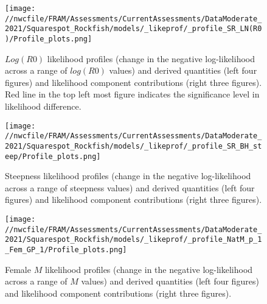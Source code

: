 \documentclass[11pt,
  english,
  a4paper,
]{article}
\begin{document}
\begin{figure}
\centering
\texttt{[image: //nwcfile/FRAM/Assessments/CurrentAssessments/DataModerate\_2021/Squarespot\_Rockfish/models/\_likeprof/\_profile\_SR\_LN(R0)/Profile\_plots.png]}
\caption{{\(Log(R0)\)\leavevmode\tagmcend\tagstructend} likelihood profiles (change in the negative log-likelihood across a range of {\(log(R0)\)\leavevmode\tagmcend\tagstructend} values) and derived quantities (left four figures) and likelihood component contributions (right three figures). Red line in the top left most figure indicates the significance level in likelihood difference.\label{fig:r0-profile-combo}}
\end{figure}

\tagmcend\tagstructend


\begin{figure}
\centering
\texttt{[image: //nwcfile/FRAM/Assessments/CurrentAssessments/DataModerate\_2021/Squarespot\_Rockfish/models/\_likeprof/\_profile\_SR\_BH\_steep/Profile\_plots.png]}
\caption{Steepness likelihood profiles (change in the negative log-likelihood across a range of steepness values) and derived quantities (left four figures) and likelihood component contributions (right three figures).\label{fig:steepness-profile-combo}}
\end{figure}

\tagmcend\tagstructend


\begin{figure}
\centering
\texttt{[image: //nwcfile/FRAM/Assessments/CurrentAssessments/DataModerate\_2021/Squarespot\_Rockfish/models/\_likeprof/\_profile\_NatM\_p\_1\_Fem\_GP\_1/Profile\_plots.png]}
\caption{Female {\(M\)\leavevmode\tagmcend\tagstructend} likelihood profiles (change in the negative log-likelihood across a range of {\(M\)\leavevmode\tagmcend\tagstructend} values) and derived quantities (left four figures) and likelihood component contributions (right three figures).\label{fig:M_f-profile-combo}}
\end{figure}
\end{document}
